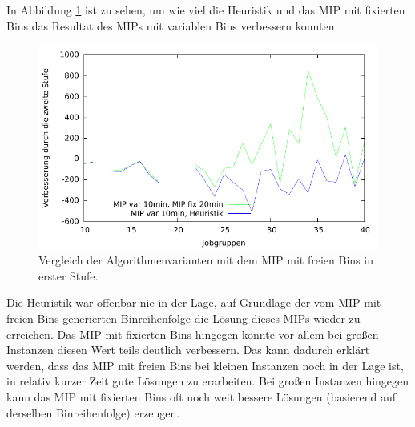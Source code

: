 \documentclass{scrreprt}
\begin{document}
In Abbildung \ref{abb:plotmipdiff} ist zu sehen, um wie viel die Heuristik und das MIP mit fixierten Bins das Resultat des MIPs mit variablen Bins verbessern konnten.
\begin{figure}
    \begin{center}
        \includegraphics[width=.8\textwidth]{../prog/binpacking/results/plotmipdiff.pdf}
    \end{center}
    \caption{
        \label{abb:plotmipdiff}
        Vergleich der Algorithmenvarianten mit dem MIP mit freien Bins in erster Stufe.
    }
\end{figure}
Die Heuristik war offenbar nie in der Lage, auf Grundlage der vom MIP mit freien Bins generierten Binreihenfolge die Lösung dieses MIPs wieder zu erreichen.
Das MIP mit fixierten Bins hingegen konnte vor allem bei großen Instanzen diesen Wert teils deutlich verbessern.
Das kann dadurch erklärt werden, dass das MIP mit freien Bins bei kleinen Instanzen noch in der Lage ist, in relativ kurzer Zeit gute Lösungen zu erarbeiten.
Bei großen Instanzen hingegen kann das MIP mit fixierten Bins oft noch weit bessere Lösungen (basierend auf derselben Binreihenfolge) erzeugen.
\end{document}
